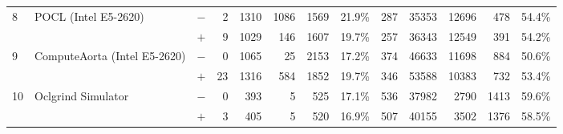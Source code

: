 \begin{tabular}{lll | rrrrr | rrrrr }
\hline
\multirow{ 2}{*}{8} & \multirow{ 2}{*}{POCL (Intel E5-2620)} & $-$ & 2 & 1310 & 1086 & 1569 & 21.9\%       & 287 & 35353 & 12696 & 478 & 54.4\% \\& & $+$ & 9 & 1029 & 146 & 1607 & 19.7\% & 257 & 36343 & 12549 & 391 & 54.2\% \\
\hline
\multirow{ 2}{*}{9} & \multirow{ 2}{*}{ComputeAorta (Intel E5-2620)} & $-$ & 0 & 1065 & 25 & 2153 & 17.2\%       & 374 & 46633 & 11698 & 884 & 50.6\% \\& & $+$ & 23 & 1316 & 584 & 1852 & 19.7\% & 346 & 53588 & 10383 & 732 & 53.4\% \\
\hline
\multirow{ 2}{*}{10} & \multirow{ 2}{*}{Oclgrind Simulator} & $-$ & 0 & 393 & 5 & 525 & 17.1\%       & 536 & 37982 & 2790 & 1413 & 59.6\% \\& & $+$ & 3 & 405 & 5 & 520 & 16.9\% & 507 & 40155 & 3502 & 1376 & 58.5\% \\
  \bottomrule
\end{tabular}

